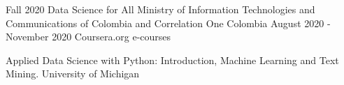 

\begin{cventries}

  \cventry
    {Fall 2020 Data Science for All} %
    {Ministry of Information Technologies and Communications of Colombia and Correlation One } %
    {Colombia} %
    {August 2020 - November 2020} %
    {}
  \cventry
    {Coursera.org} %
    {e-courses} %
    {} %
    {} %
    {
      \begin{cvitems} %
        \item {Applied Data Science with Python: Introduction, Machine Learning and Text Mining. University of Michigan}
      \end{cvitems}
    }
\end{cventries}
